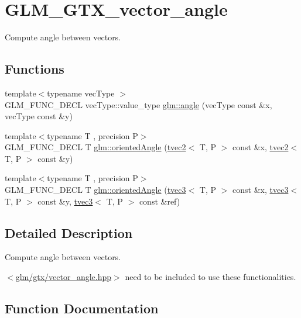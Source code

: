 \hypertarget{group__gtx__vector__angle}{}\section{G\+L\+M\+\_\+\+G\+T\+X\+\_\+vector\+\_\+angle}
\label{group__gtx__vector__angle}


Compute angle between vectors.  


\subsection*{Functions}
\begin{DoxyCompactItemize}
\item 
{\footnotesize template$<$typename vec\+Type $>$ }\\G\+L\+M\+\_\+\+F\+U\+N\+C\+\_\+\+D\+E\+CL vec\+Type\+::value\+\_\+type \hyperlink{group__gtx__vector__angle_gab8691008a2536b681b711211816c14f7}{glm\+::angle} (vec\+Type const \&x, vec\+Type const \&y)
\item 
{\footnotesize template$<$typename T , precision P$>$ }\\G\+L\+M\+\_\+\+F\+U\+N\+C\+\_\+\+D\+E\+CL T \hyperlink{group__gtx__vector__angle_ga82a19d474be13c92c7b10caab42a5a72}{glm\+::oriented\+Angle} (\hyperlink{structglm_1_1tvec2}{tvec2}$<$ T, P $>$ const \&x, \hyperlink{structglm_1_1tvec2}{tvec2}$<$ T, P $>$ const \&y)
\item 
{\footnotesize template$<$typename T , precision P$>$ }\\G\+L\+M\+\_\+\+F\+U\+N\+C\+\_\+\+D\+E\+CL T \hyperlink{group__gtx__vector__angle_ga7254dba112eff55f55f9544f41cb9ece}{glm\+::oriented\+Angle} (\hyperlink{structglm_1_1tvec3}{tvec3}$<$ T, P $>$ const \&x, \hyperlink{structglm_1_1tvec3}{tvec3}$<$ T, P $>$ const \&y, \hyperlink{structglm_1_1tvec3}{tvec3}$<$ T, P $>$ const \&ref)
\end{DoxyCompactItemize}


\subsection{Detailed Description}
Compute angle between vectors. 

$<$\hyperlink{vector__angle_8hpp}{glm/gtx/vector\+\_\+angle.\+hpp}$>$ need to be included to use these functionalities. 

\subsection{Function Documentation}
\mbox{\label{group__gtx__vector__angle_gab8691008a2536b681b711211816c14f7}} 
